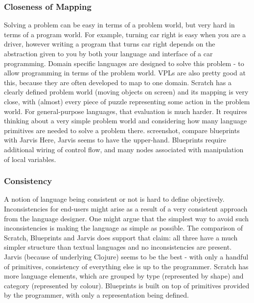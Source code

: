 \documentclass[11pt]{scrartcl}
\begin{document}
\subsubsection{Closeness of Mapping}
Solving a problem can be easy in terms of a problem world, but very hard in terms of a program world. For example, turning car right is easy when you are a driver, however writing a program that turns car right depends on the abstraction given to you by both your language and interface of a car programming. Domain specific languages are designed to solve this problem - to allow programming in terms of the problem world. VPLs are also pretty good at this, because they are often developed to map to one domain. Scratch has a clearly defined problem world (moving objects on screen) and its mapping is very close, with (almost) every piece of puzzle representing some action in the problem world. For general-purpose languages, that evaluation is much harder. It requires thinking about a very simple problem world and considering how many language primitives are needed to solve a problem there. 
{screenshot, compare blueprints with Jarvis}
Here, Jarvis seems to have the upper-hand. Blueprints require additional wiring of control flow, and many nodes associated with manipulation of local variables.
\subsubsection{Consistency}
A notion of language being consistent or not is hard to define objectively. Inconsistencies for end-users might arise as a result of a very consistent approach from the language designer. One might argue that the simplest way to avoid such inconsistencies is making the language as simple as possible. The comparison of Scratch, Blueprints and Jarvis does support that claim: all three have a much simpler structure than textual languages and no inconsistencies are present. Jarvis (because of underlying Clojure) seems to be the best - with only a handful of primitives, consistency of everything else is up to the programmer. Scratch has more language elements, which are grouped by type (represented by shape) and category (represented by colour). Blueprints is built on top of primitives provided by the programmer, with only a representation being defined.
\end{document}
